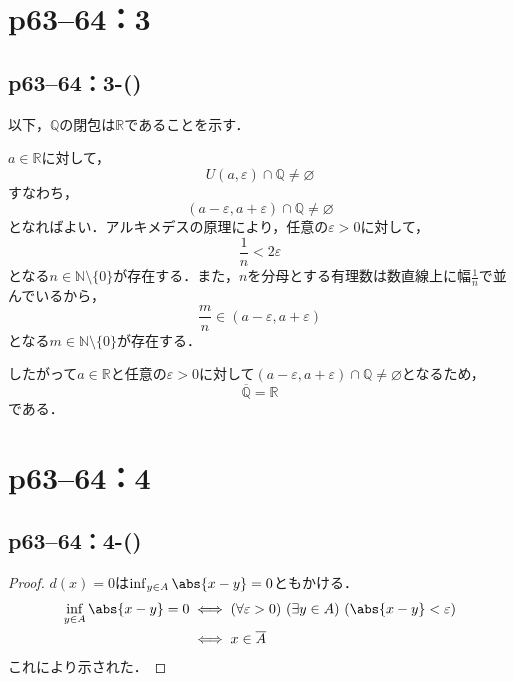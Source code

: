 \section*{p63--64：3}


\subsection*{p63--64：3-()}

\begin{tleftbar}
    以下，$\mathbb{Q}$の閉包は$\mathbb{R}$であることを示す．

    $a \in \mathbb{R}$に対して，
    \[
        U(a,\varepsilon) \cap \mathbb{Q} \ne \varnothing
    \]
    すなわち，
    \[
        (a-\varepsilon,a+\varepsilon) \cap \mathbb{Q} \ne \varnothing
    \]
    となればよい．アルキメデスの原理により，任意の$\varepsilon >0$に対して，
    \[
        \frac{1}{n}< 2\varepsilon
    \]
    となる$n \in \mathbb{N} \setminus \{0\}$が存在する．また，$n$を分母とする有理数は数直線上に幅$\frac{1}{n}$で並んでいるから，
    \[
        \frac{m}{n} \in (a-\varepsilon,a+\varepsilon)
    \]
    となる$ m \in \mathbb{N} \setminus \{0\}$が存在する．\par
    したがって$a \in \mathbb{R}$と任意の$\varepsilon>0$に対して$(a-\varepsilon,a+\varepsilon) \cap \mathbb{Q} \ne \varnothing$となるため，
    \[
        \overline{\mathbb{Q}}=\mathbb{R}
    \]
    である．
\end{tleftbar}


\section*{p63--64：4}


\subsection*{p63--64：4-()}

\begin{tleftbar}
    \begin{proof}
        $d(x)=0$は$\inf_{y \in A} \abs{x-y} =0$ともかける．
        \begin{align*}
            \inf_{y \in A} \abs{x-y} =0 & \iff (\forall \varepsilon>0) \ (\exists y \in A)\ ( \abs{x-y}<\varepsilon ) \\
                                        & \iff x \in \overline{A}
        \end{align*}
        これにより示された．
    \end{proof}
\end{tleftbar}


